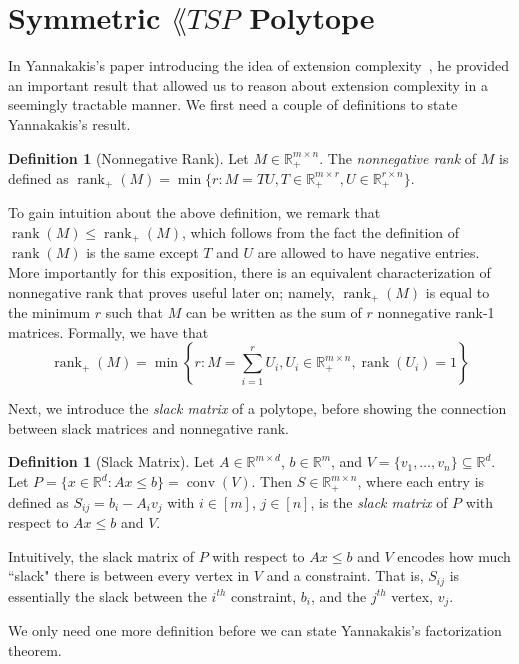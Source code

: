 \documentclass{article}
\theoremstyle{definition}
\newtheorem{definition}[theorem]{Definition}
\theoremstyle{remark}
\newcommand{\nrank}{\operatorname{rank}_+}
\newcommand{\rank}{\operatorname{rank}}
\newcommand{\conv}{\operatorname{conv}}
\renewcommand{\R}{\mathbb{R}}
\begin{document}
\section{Symmetric $\lang{TSP}$ Polytope}\label{sec:symmetric-tsp}

In Yannakakis's paper introducing the idea of extension complexity~\cite{yannakakis}, he provided an important result that allowed us to reason about extension complexity in a seemingly tractable manner. We first need a couple of definitions to state Yannakakis's result.

\begin{definition}[Nonnegative Rank]
Let $M \in \R_+^{m \times n}$. The \emph{nonnegative rank} of $M$ is defined as $\nrank(M) = \min\{r : M = TU, T \in \R_+^{m \times r}, U \in \R_+^{r \times n}\}$.
\end{definition}

To gain intuition about the above definition, we remark that $\rank(M) \le \nrank(M)$, which follows from the fact the definition of $\rank(M)$ is the same except $T$ and $U$ are allowed to have negative entries. More importantly for this exposition, there is an equivalent characterization of nonnegative rank that proves useful later on; namely, $\nrank(M)$ is equal to the minimum $r$ such that $M$ can be written as the sum of $r$ nonnegative rank-1 matrices. Formally, we have that 
\[
\nrank(M) = \min\left\{r : M =\sum_{i=1}^r U_i, U_i \in \R_+^{m \times n}, \rank(U_i) = 1\right\}
\]

Next, we introduce the \emph{slack matrix} of a polytope, before showing the connection between slack matrices and nonnegative rank.

\begin{definition}[Slack Matrix]
Let $A \in \R^{m \times d}$, $b \in \R^m$, and $V = \{v_1, \ldots, v_n\} \subseteq \R^d$. Let $P = \{x \in \R^d : Ax \le b\} = \conv(V)$. Then $S \in \R_+^{m\times n}$, where each entry is defined as $S_{ij} = b_i - A_i v_j$ with $i \in [m]$, $j \in [n]$, is the \emph{slack matrix} of $P$ with respect to $Ax \le b$ and $V$.
\end{definition}

Intuitively, the slack matrix of $P$ with respect to $Ax \le b$ and $V$ encodes how much ``slack" there is between every vertex in $V$ and a constraint. That is, $S_{ij}$ is essentially the slack between the $i^{th}$ constraint, $b_i$, and the $j^{th}$ vertex, $v_j$.

We only need one more definition before we can state Yannakakis's factorization theorem. 
\end{document}
